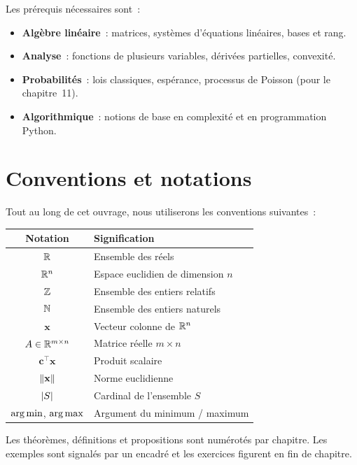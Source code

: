 Les pr\'erequis n\'ecessaires sont~:
\begin{itemize}
  \item \textbf{Alg\`ebre lin\'eaire}~: matrices, syst\`emes d'\'equations
        lin\'eaires, bases et rang.
  \item \textbf{Analyse}~: fonctions de plusieurs variables, d\'eriv\'ees
        partielles, convexit\'e.
  \item \textbf{Probabilit\'es}~: lois classiques, esp\'erance, processus de
        Poisson (pour le chapitre~11).
  \item \textbf{Algorithmique}~: notions de base en complexit\'e et en
        programmation Python.
\end{itemize}

\section*{Conventions et notations}

Tout au long de cet ouvrage, nous utiliserons les conventions suivantes~:

\begin{center}
\renewcommand{\arraystretch}{1.3}
\begin{tabular}{cl}
  \toprule
  \textbf{Notation} & \textbf{Signification} \\
  \midrule
  $\mathbb{R}$            & Ensemble des r\'eels \\
  $\mathbb{R}^n$          & Espace euclidien de dimension $n$ \\
  $\mathbb{Z}$            & Ensemble des entiers relatifs \\
  $\mathbb{N}$            & Ensemble des entiers naturels \\
  $\mathbf{x}$    & Vecteur colonne de $\mathbb{R}^n$ \\
  $A \in \mathbb{R}^{m \times n}$ & Matrice r\'eelle $m \times n$ \\
  $\mathbf{c}^\top \mathbf{x}$ & Produit scalaire \\
  $\left\| \mathbf{x} \right\|$ & Norme euclidienne \\
  $\left| S \right|$       & Cardinal de l'ensemble $S$ \\
  $\operatorname*{arg\,min}$, $\operatorname*{arg\,max}$ & Argument du minimum / maximum \\
  \bottomrule
\end{tabular}
\end{center}

Les th\'eor\`emes, d\'efinitions et propositions sont num\'erot\'es par chapitre.
Les exemples sont signal\'es par un encadr\'e et les exercices figurent en fin de
chapitre.

